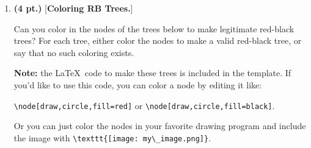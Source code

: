 \documentclass[11pt]{article}
\newcommand{\pts}[1]{\textbf{(#1 pt.)}}
\begin{document}
\begin{enumerate}
\begin{figure}[h]
\begin{algorithm}[H]
{
Choose a random duck from the flock\;
}
Choose a random duck from the flock\;
\caption{\textsc{findGreenDuck2}}
\end{algorithm}

\begin{algorithm}[H]
Put the ducks in a line, in a random order \;
{
}
\caption{\textsc{findGreenDuck3}}
\end{algorithm}
\caption{Three algorithms for finding a green duck}\label{algs}
\end{figure}\clearpage

\ifdefined\template
\begin{shaded}
\textbf{SOLUTION:}

\ifdefined\sol

\fi
\end{shaded}
\fi



\item {\pts{4} [\textbf{Coloring RB Trees.}] }
	
	Can you color in the nodes of the trees below to make legitimate red-black trees? For each tree, either color the nodes to make a valid red-black tree, or say that no such coloring exists.  
 
 \textbf{Note:} the \LaTeX\ code to make these trees is included in the template.  If you'd like to use this code, you can color a node by editing it like: 
 
 \verb|\node[draw,circle,fill=red]| or \verb|\node[draw,circle,fill=black]|.  
 
 Or you can just color the nodes in your favorite drawing program and include the image with \verb|\texttt{[image: my\_image.png]}|.
    
    \begin{center}
\end{center}
\end{enumerate}
\end{document}
